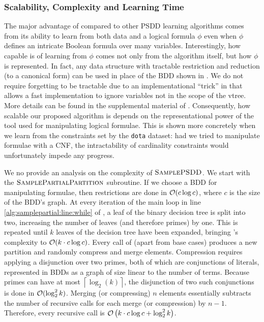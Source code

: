 \subsubsection{Scalability, Complexity and Learning Time}

The major advantage of  compared to other PSDD learning algorithms comes from
its ability to learn from both data and a logical formula $\phi$ even when $\phi$ defines an
intricate Boolean formula over many variables. Interestingly, how capable  is
of learning from $\phi$ comes not only from the algorithm itself, but how $\phi$ is represented. In
fact, any data structure with tractable restriction and reduction (to a canonical form) can be used
in place of the BDD shown in . We do not require forgetting to be tractable
due to an implementational ``trick'' in  that allows a fast implementation to
ignore variables not in the scope of the vtree. More details can be found in the supplemental
material of . Consequently, how scalable our proposed algorithm is
depends on the representational power of the tool used for manipulating logical formulae. This is
shown more concretely when we learn from the constraints set by the \texttt{dota} dataset: had we
tried to manipulate formulae with a CNF, the intractability of cardinality constraints would
unfortunately impede any progress.

We no provide an analysis on the complexity of $\textproc{SamplePSDD}$. We start with the
$\textproc{SamplePartialPartition}$ subroutine. If we choose a BDD for manipulating formulae, then
restrictions are done in $\mathcal{O}(c\log c)$, where $c$ is the size of the BDD's graph. At every
iteration of the main loop in line \ref{alg:samplepartial:line:while} of ,
a leaf of the binary decision tree is split into two, increasing the number of leaves (and
therefore primes) by one. This is repeated until $k$ leaves of the decision tree have been
expanded, bringing 's complexity to $\mathcal{O}(k\cdot c\log c)$. Every
call of  (apart from base cases) produces a new partition and randomly
compress and merge elements. Compression requires applying a disjunction over two primes, both of
which are conjunctions of literals, represented in BDDs as a graph of size linear to the number of
terms. Because primes can have at most $\left\lceil\log_2(k)\right\rceil$, the disjunction of two
such conjunctions is done in $\mathcal{O}(\log_2^2 k)$. Merging (or compressing) $n$ elements
essentially subtracts the number of recursive calls for each merge (or compression) by $n-1$.
Therefore, every  recursive call is $\mathcal{O}\left(k\cdot c\log c+\log_2^2 k
\right)$.


